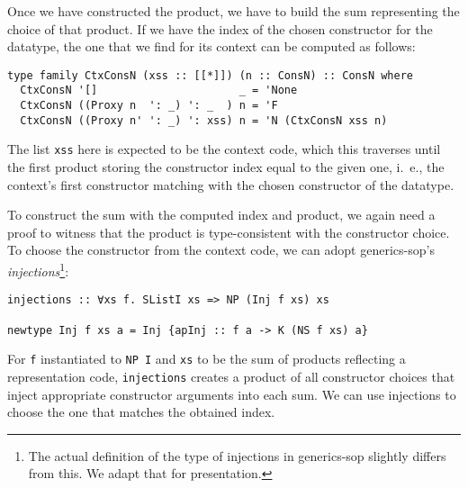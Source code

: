 \documentclass[runningheads]{llncs}
\newcommand{\K}[1]{\lstinline{#1}}
\begin{document}
Once we have constructed the product, we have to build the sum representing the choice of that product. If we have the index of the chosen constructor for the datatype, the one that we find for its context can be computed as follows:
\begin{lstlisting}
type family CtxConsN (xss :: [[*]]) (n :: ConsN) :: ConsN where
  CtxConsN '[]                      _ = 'None
  CtxConsN ((Proxy n  ': _) ': _  ) n = 'F
  CtxConsN ((Proxy n' ': _) ': xss) n = 'N (CtxConsN xss n)
\end{lstlisting}
The list \K{xss} here is expected to be the context code, which this traverses until the first product storing the constructor index equal to the given one, i.~e., the context's first constructor matching with the chosen constructor of the datatype.

To construct the sum with the computed index and product, we again need a proof to witness that the product is type-consistent with the constructor choice. To choose the constructor from the context code, we can adopt \textsf{generics-sop}'s \emph{injections}\footnote{The actual definition of the type of injections in \textsf{generics-sop} slightly differs from this. We adapt that for presentation.}:
\begin{lstlisting}
injections :: ∀xs f. SListI xs => NP (Inj f xs) xs

newtype Inj f xs a = Inj {apInj :: f a -> K (NS f xs) a}
\end{lstlisting}
For \K{f} instantiated to \K{NP I} and \K{xs} to be the sum of products reflecting a representation code, \K{injections} creates a product of all constructor choices that inject appropriate constructor arguments into each sum. We can use injections to choose the one that matches the obtained index.
\end{document}
